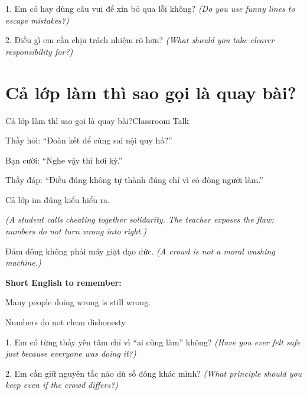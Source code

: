 \begin{tuhocnhanh}
1. Em có hay dùng câu vui để xin bỏ qua lỗi không? \textit{(Do you use funny lines to escape mistakes?)}

2. Điều gì em cần chịu trách nhiệm rõ hơn? \textit{(What should you take clearer responsibility for?)}
\end{tuhocnhanh}
\ngancach

\section{Cả lớp làm thì sao gọi là quay bài?}
\begin{truyen}{Cả lớp làm thì sao gọi là quay bài?}{Classroom Talk}

Thầy hỏi: ``Đoàn kết để cùng sai nội quy hả?''

Bạn cười: ``Nghe vậy thì hơi kỳ.''

Thầy đáp: ``Điều đúng không tự thành đúng chỉ vì có đông người làm.''

Cả lớp im đúng kiểu hiểu ra.

\textit{(A student calls cheating together solidarity. The teacher exposes the flaw: numbers do not turn wrong into right.)}
\end{truyen}

\begin{baihoc}
Đám đông không phải máy giặt đạo đức.
\textit{(A crowd is not a moral washing machine.)}
\end{baihoc}

\begin{ghinhoanh}
\textbf{Short English to remember:}

Many people doing wrong is still wrong.

Numbers do not clean dishonesty.
\end{ghinhoanh}

\begin{tuhocnhanh}
1. Em có từng thấy yên tâm chỉ vì ``ai cũng làm'' không? \textit{(Have you ever felt safe just because everyone was doing it?)}

2. Em cần giữ nguyên tắc nào dù số đông khác mình? \textit{(What principle should you keep even if the crowd differs?)}
\end{tuhocnhanh}
\ngancach

